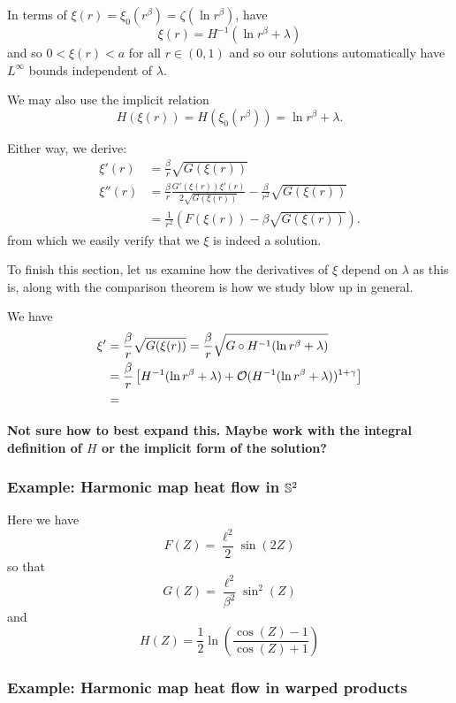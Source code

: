 \documentclass{amsart}
\begin{document}
In terms of \(\xi(r) = \xi_0(r^{\beta}) = \zeta(\ln r^{\beta})\), have
\[
\xi(r) = H^{-1} (\ln r^{\beta} + \lambda)
\]
and so \(0 < \xi(r) < a\) for all \(r \in (0, 1)\) and so our solutions automatically have \(L^{\infty}\) bounds independent of \(\lambda\).

We may also use the implicit relation
\[
H (\xi(r)) = H (\xi_0(r^{\beta})) = \ln r^{\beta} + \lambda.
\]

Either way, we derive:
\begin{align*}
\xi'(r) &= \frac{\beta}{r}  \sqrt{G(\xi(r))} \\
\xi''(r) &= \frac{\beta}{r} \frac{G'(\xi(r)) \xi'(r)}{2 \sqrt{G(\xi(r))}} - \frac{\beta}{r^2} \sqrt{G(\xi(r))} \\
&= \frac{1}{r^2} \left(F(\xi(r))- \beta \sqrt{G(\xi(r))}\right).
\end{align*}
from which we easily verify that we \(\xi\) is indeed a solution.

To finish this section, let us examine how the derivatives of \(\xi\) depend on \(\lambda\) as this is, along with the comparison theorem is how we study blow up in general.

We have
\[
\begin{split}
\xi' &= \frac{\beta}{r}  \sqrt{G(\xi(r))} = \frac{\beta}{r}  \sqrt{G \circ H^{-1}(\ln r^{\beta} + \lambda)} \\
&= \frac{\beta}{r} \left[H^{-1} (\ln r^{\beta} + \lambda)  + \bigo(H^{-1} (\ln r^{\beta} + \lambda))^{1 + \gamma}\right] \\
&= 
\end{split}
\]

\textbf{Not sure how to best expand this. Maybe work with the integral definition of \(H\) or the implicit form of the solution?}

\subsubsection*{Example: Harmonic map heat flow in \(\S^2\)}

Here we have
\[
F(Z) = \frac{\ell^2}{2} \sin(2Z)
\]
so that
\[
G(Z) = \frac{\ell^2}{\beta^2} \sin^2(Z)
\]
and
\[
H(Z) = \frac{1}{2} \ln \left(\frac{\cos(Z) - 1}{\cos(Z) + 1}\right)
\]

\subsubsection*{Example: Harmonic map heat flow in warped products}
\end{document}
